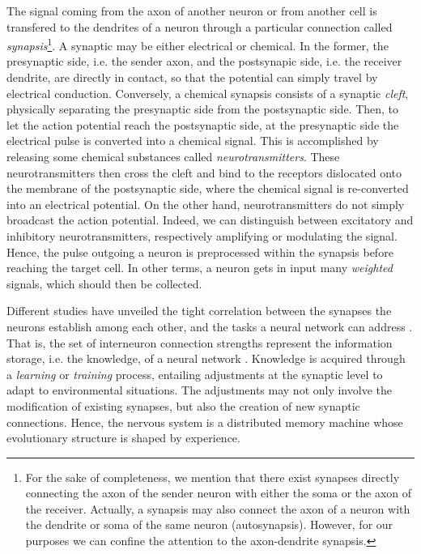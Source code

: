 \documentclass[11pt, a4paper]{report}
\theoremstyle{theorem}
\numberwithin{equation}{section}
\numberwithin{figure}{section}
\begin{document}
		The signal coming from the axon of another neuron or from another cell is transfered to the dendrites of a neuron through a particular connection called \emph{synapsis}\footnote{For the sake of completeness, we mention that there exist synapses directly connecting the axon of the sender neuron with either the soma or the axon of the receiver. Actually, a synapsis may also connect the axon of a neuron with the dendrite or soma of the same neuron (autosynapsis). However, for our purposes we can confine the attention to the axon-dendrite synapsis.}. A synaptic may be either electrical or chemical. In the former, the presynaptic side, i.e. the sender axon, and the postsynapic side, i.e. the receiver dendrite, are directly in contact, so that the potential can simply travel by electrical conduction. Conversely, a chemical synapsis consists of a synaptic \emph{cleft}, physically separating the presynaptic side from the postsynaptic side. Then, to let the action potential reach the postsynaptic side, at the presynaptic side the electrical pulse is converted into a chemical signal. This is accomplished by releasing some chemical substances called \emph{neurotransmitters}. These neurotransmitters then cross the cleft and bind to the receptors dislocated onto the membrane of the postsynaptic side, where the chemical signal is re-converted into an electrical potential. On the other hand, neurotransmitters do not simply broadcast the action potential. Indeed, we can distinguish between excitatory and inhibitory neurotransmitters, respectively amplifying or modulating the signal. Hence, the pulse outgoing a neuron is preprocessed within the synapsis before reaching the target cell. In other terms, a neuron gets in input many \emph{weighted} signals, which should then be collected.
		
		 Different studies have unveiled the tight correlation between the synapses the neurons establish among each other, and the tasks a neural network can address \cite{Hag14}. That is, the set of interneuron connection strengths represent the information storage, i.e. the knowledge, of a neural network \cite{Kri}. Knowledge is acquired through a \emph{learning} or \emph{training} process, entailing adjustments at the synaptic level to adapt to environmental situations. The adjustments may not only involve the modification of existing synapses, but also the creation of new synaptic connections. Hence, the nervous system is a distributed memory machine whose evolutionary structure is shaped by experience.
		 
\end{document}
